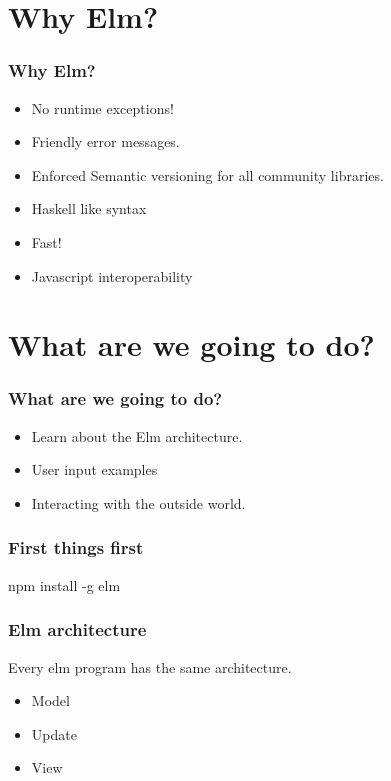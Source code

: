 \documentclass[aspectratio=1610]{beamer}
\begin{document}
\section{Why Elm?} %
\begin{frame}
\frametitle{Why Elm?}
    \begin{itemize}
      \item No runtime exceptions!
      \item Friendly error messages.
      \item Enforced Semantic versioning for all community libraries.
      \item Haskell like syntax
      \item Fast!
      \item Javascript interoperability
    \end{itemize}
\end{frame} 
\section{What are we going to do?} %
\begin{frame}
\frametitle{What are we going to do?}
    \begin{itemize}
      \item Learn about the Elm architecture.
      \item User input examples
      \item Interacting with the outside world.
    \end{itemize}
\end{frame} 

\begin{frame}[c]
\frametitle{First things first}

\begin{center}
     \Huge npm install -g elm
\end{center}

\end{frame}

\begin{frame}
\frametitle{Elm architecture}
     Every elm program has the same architecture.
    \begin{itemize}
      \item Model
      \item Update
      \item View
    \end{itemize}
\end{frame}
\end{document}
